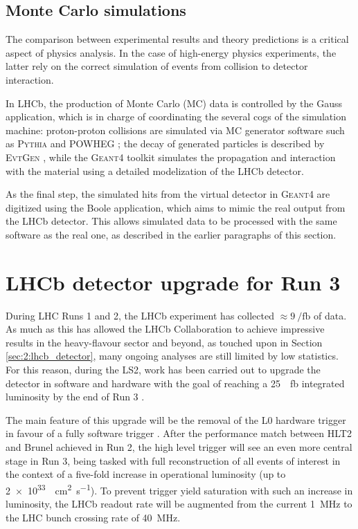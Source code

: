 \subsection{Monte Carlo simulations}
\label{sec:2:monte_carlo}
The comparison between experimental results and theory predictions is a critical aspect of physics analysis.
In the case of high-energy physics experiments, the latter rely on the correct simulation of events from collision to detector interaction.

In LHCb, the production of Monte Carlo (MC) data is controlled by the Gauss application, which is in charge of coordinating the several cogs of the simulation machine:
proton-proton collisions are simulated via MC generator software such as \textsc{Pythia} \cite{Pythia2015} and \textsc{POWHEG} \cite{Alioli:2010xd}; the decay of generated particles is described by \textsc{EvtGen} \cite{Ryd:2005zz}, while the \textsc{Geant4} toolkit \cite{AGOSTINELLI2003250} simulates the propagation and interaction with the material using a detailed modelization of the LHCb detector.

As the final step, the simulated hits from the virtual detector in \textsc{Geant4} are digitized using the Boole application, which aims to mimic the real output from the LHCb detector.
This allows simulated data to be processed with the same software as the real one, as described in the earlier paragraphs of this section.

\section{LHCb detector upgrade for Run 3}
\label{sec:2:upgrade}

During LHC Runs 1 and 2, the LHCb experiment has collected $\approx \SI{9}{\per\femto\barn}$ of data.
As much as this has allowed the LHCb Collaboration to achieve impressive results in the heavy-flavour sector and beyond, as touched upon in Section \ref{sec:2:lhcb_detector}, many ongoing analyses are still limited by low statistics.
For this reason, during the LS2, work has been carried out to upgrade the detector in software and hardware with the goal of reaching a \SI{25}{\per\femto\barn} integrated luminosity by the end of Run 3 \cite{Piucci_2017}.

The main feature of this upgrade will be the removal of the L0 hardware trigger in favour of a fully software trigger \cite{CERN-LHCC-2014-016}.
After the performance match between HLT2 and Brunel achieved in Run 2, the high level trigger will see an even more central stage in Run 3, being tasked with full reconstruction of all events of interest in the context of a five-fold increase in operational luminosity (up to \SI{2e33}{\per\centi\meter\squared\per\second}).
To prevent trigger yield saturation with such an increase in luminosity, the LHCb readout rate will be augmented from the current \SI{1}{\mega\hertz} to the LHC bunch crossing rate of \SI{40}{\mega\hertz}.

